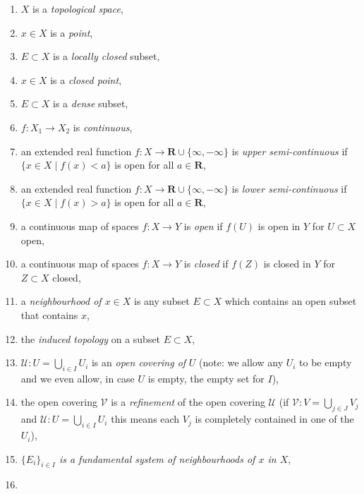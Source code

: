 \begin{enumerate}
\item
\label{item-space}
$X$ is a {\it topological space},
\item
\label{item-point}
$x\in X$ is a {\it point},
\item
\label{item-locally-closed}
$E \subset X$ is a {\it locally closed} subset,
\item
\label{item-closed-point}
$x\in X$ is a {\it closed point},
\item
\label{item-dense}
$E \subset X$ is a {\it dense} subset,
\item
\label{item-continuous}
$f : X_1 \to X_2$ is {\it continuous},
\item
\label{item-upper-semi-continuous}
an extended real function $f : X \to \mathbf{R} \cup \{\infty, -\infty\}$
is {\it upper semi-continuous} if $\{x \in X \mid f(x) < a\}$ is open for
all $a \in \mathbf{R}$,
\item
\label{item-lower-semi-continuous}
an extended real function $f : X \to \mathbf{R} \cup \{\infty, -\infty\}$
is {\it lower semi-continuous} if $\{x \in X \mid f(x) > a\}$ is open for
all $a \in \mathbf{R}$,
\item a continuous map of spaces $f : X \to Y$ is
{\it open} if $f(U)$ is open in $Y$ for $U \subset X$ open,
\item a continuous map of spaces $f : X \to Y$ is
{\it closed} if $f(Z)$ is closed in $Y$ for $Z \subset X$ closed,
\item
\label{item-neighbourhood}
a {\it neighbourhood of $x \in X$} is any subset
$E \subset X$ which contains an open subset that
contains $x$,
\item
\label{item-induced-topology}
the {\it induced topology} on a subset $E \subset X$,
\item
\label{item-covering}
$\mathcal{U} : U = \bigcup_{i \in I} U_i$ is an
{\it open covering of} $U$ (note: we allow any $U_i$ to be empty
and we even allow, in case $U$ is empty, the empty set for $I$),
\item
\label{item-refinement}
the open covering $\mathcal{V}$ is a {\it refinement}
of the open covering $\mathcal{U}$ (if
$\mathcal{V} : V = \bigcup_{j \in J} V_j$ and
$\mathcal{U} : U = \bigcup_{i \in I} U_i$
this means each $V_j$ is completely contained in one of the $U_i$),
\item
\label{item-fundamental-system}
{\it $\{ E_i \}_{i \in I}$ is a fundamental system of neighbourhoods
of $x$ in $X$},
\item
\label{item-Hausdorff}

\end{enumerate}
